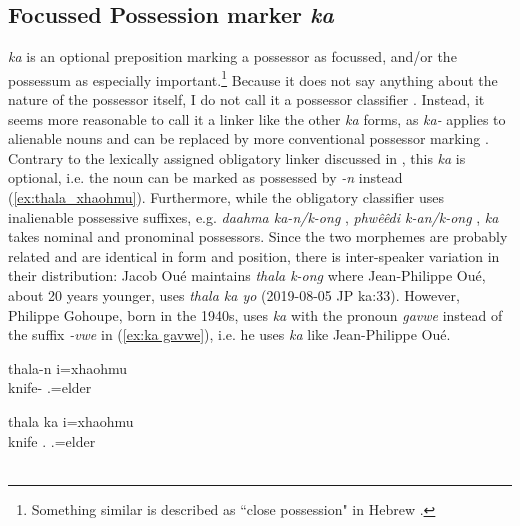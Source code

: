 \subsection{Focussed Possession marker \textit{ka}}
\label{ssec:foc_poss_ka}
\textit{ka} is an optional preposition marking a possessor as focussed, and/or the possessum as especially important.\footnote{Something similar is described as ``close possession" in Hebrew \parencite{berman_modern_1978}.} Because it does not say anything about the nature of the possessor itself, I do not call it a possessor classifier \parencite[125]{aikhenvald_classifiers_2000}. Instead, it seems more reasonable to call it a linker like the other \textit{ka} forms, as \textit{ka-} applies to alienable nouns and can be replaced by more conventional possessor marking \parencite[136]{aikhenvald_classifiers_2000}. Contrary to the lexically assigned obligatory linker discussed in , this \textit{ka} is optional, i.e. the noun can be marked as possessed by \textit{-n}  instead (\ref{ex:thala_xhaohmu}). Furthermore, while the obligatory classifier uses inalienable possessive suffixes, e.g. \textit{daahma ka-n/k-ong} , \textit{phwêêdi k-an/k-ong} , \textit{ka}  takes nominal and pronominal possessors. Since the two morphemes are probably related and are identical in form and position, there is inter-speaker variation in their distribution: Jacob Oué maintains \textit{thala k-ong}  where Jean-Philippe Oué, about 20 years younger, uses \textit{thala ka yo} (2019-08-05 JP ka:33). However, Philippe Gohoupe, born in the 1940s, uses \textit{ka} with the pronoun \textit{gavwe} instead of the suffix \textit{-vwe} in (\ref{ex:ka gavwe}), i.e. he uses \textit{ka}  like Jean-Philippe Oué.  %

\ea
\label{ex:thala_xhaohmu}
\gll 	thala-n i=xhaohmu	\\
	knife- .=elder	\\
\glt  {}		
\z

\ea
\gll 	thala ka i=xhaohmu	\\
	knife . .=elder	\\
\glt  {} \\ 
\z

